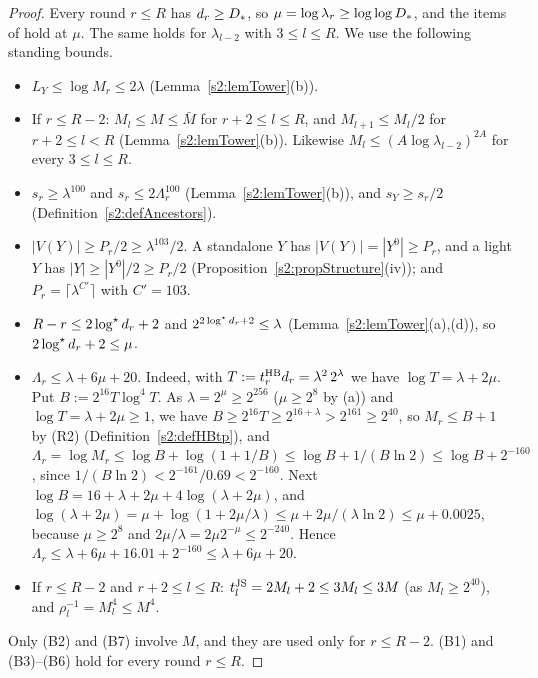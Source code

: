 \begin{proof}
Every round $r\le R$ has $d_r\ge D_{*}$, so $\mu=\log\lambda_r\ge\log\log D_{*}$, and
the items of  hold at $\mu$. The same holds for $\lambda_{l-2}$ with
$3\le l\le R$. We use
the following standing bounds.
\begin{itemize}
\item[(B1)] $L_Y\le\log M_r\le2\lambda$ (Lemma~\ref{s2:lemTower}(b)).
\item[(B2)] If $r\le R-2$: $M_l\le M\le\bar M$ for $r+2\le l\le R$, and
  $M_{l+1}\le M_l/2$ for $r+2\le l<R$ (Lemma~\ref{s2:lemTower}(b)). Likewise
  $M_l\le(A\log\lambda_{l-2})^{2A}$ for every $3\le l\le R$.
\item[(B3)] $s_r\ge\lambda^{100}$ and $s_r\le2\Lambda_r^{100}$ (Lemma~\ref{s2:lemTower}(b)),
  and $s_Y\ge s_r/2$ (Definition~\ref{s2:defAncestors}).
\item[(B4)] $|V(Y)|\ge P_r/2\ge\lambda^{103}/2$. A standalone $Y$ has
  $|V(Y)|=|Y^0|\ge P_r$, and a light $Y$ has $|Y|\ge|Y^0|/2\ge P_r/2$
  (Proposition~\ref{s2:propStructure}(iv)); and $P_r=\lceil\lambda^{C'}\rceil$
  with $C'=103$.
\item[(B5)] $R-r\le2\log^{\star} d_r+2$ and $2^{2\log^{\star} d_r+2}\le\lambda$
  (Lemma~\ref{s2:lemTower}(a),(d)), so $2\log^{\star} d_r+2\le\mu$.
\item[(B6)] $\Lambda_r\le\lambda+6\mu+20$. Indeed, with
  $T:=t^{\mathrm{HB}}_rd_r=\lambda^2\,2^{\lambda}$ we have $\log T=\lambda+2\mu$. Put
  $B:=2^{16}T\log^4T$. As $\lambda=2^\mu\ge2^{256}$ ($\mu\ge2^8$ by (a)) and
  $\log T=\lambda+2\mu\ge1$, we have $B\ge2^{16}T\ge2^{16+\lambda}>2^{161}\ge2^{40}$,
  so $M_r\le B+1$ by (R2) (Definition~\ref{s2:defHBtp}), and
  $\Lambda_r=\log M_r\le\log B+\log(1+1/B)\le\log B+1/(B\ln2)\le\log B+2^{-160}$,
  since $1/(B\ln2)<2^{-161}/0.69<2^{-160}$. Next
  $\log B=16+\lambda+2\mu+4\log(\lambda+2\mu)$, and
  $\log(\lambda+2\mu)=\mu+\log(1+2\mu/\lambda)\le\mu+2\mu/(\lambda\ln2)\le\mu+0.0025$,
  because $\mu\ge2^8$ and $2\mu/\lambda=2\mu2^{-\mu}\le2^{-240}$. Hence
  $\Lambda_r\le\lambda+6\mu+16.01+2^{-160}\le\lambda+6\mu+20$.
\item[(B7)] If $r\le R-2$ and $r+2\le l\le R$: $t^{\mathrm{JS}}_l=2M_l+2\le3M_l\le3M$
  (as $M_l\ge2^{40}$), and $\rho_l^{-1}=M_l^4\le M^4$.
\end{itemize}
Only (B2) and (B7) involve $M$, and they are used only for $r\le R-2$.
(B1) and (B3)--(B6) hold for every round $r\le R$.


\end{proof}
